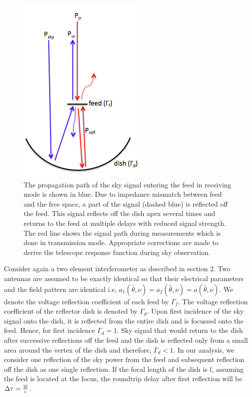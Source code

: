 \documentclass[twocolumn]{emulateapj}
\newcommand{\thhat}{{\hat\theta}}
\begin{document}
\begin{figure}[ht!]
\centering
\includegraphics[totalheight=0.35\textheight]{plots/reflection_cartoon.png}
\caption{The propagation path of the sky signal entering the
feed in receiving mode is shown in blue. Due to impedance mismatch between feed and the free space, a part of the signal (dashed blue) is reflected off the feed. This signal reflects off the dish apex several times and returns to the feed at multiple delays with reduced signal strength. The red line shows the signal path during measurements which is done in transmission mode. Appropriate corrections are made to derive the telescope response function during sky observation. }
\label{fig:cartoon}
\end{figure}

Consider again a two element interferometer as described in section 2. Two antennas are assumed to be exactly identical so that their electrical parameters and the field pattern are identical i.e, $a_{1}(\thhat,\nu) = a_{2}(\thhat,\nu) = a(\thhat, \nu)$. We denote the voltage reflection coefficient of each feed by $\Gamma_{f}$. The voltage reflection coefficient of the reflector dish is denoted by $\Gamma_{d}$. Upon first incidence of the sky signal onto the dish, it is reflected from the entire dish and is focussed onto the feed. Hence, for first incidence $\Gamma_{d}=1$. Sky signal that would return to the dish after successive reflections off the feed and the dish is reflected only from a small area around the vertex of the dish and therefore, $\Gamma_{d}<1$. In our analysis, we consider one reflection of the sky power from the feed and subsequent reflection off the dish as one single reflection. If the focal length of the dish is $l$, assuming the feed is located at the focus, the roundtrip delay after first reflection will be $\Delta \tau = {2l \over c}$. 
\end{document}
